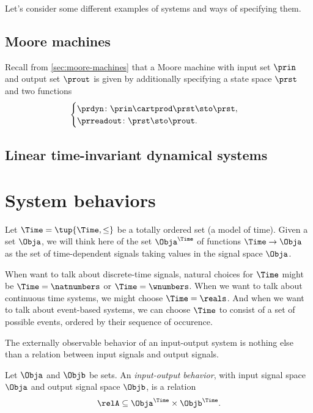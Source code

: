 

Let's consider some different examples of systems and ways of specifying them.

\subsection{Moore machines}

Recall from \cref{sec:moore-machines} that a Moore machine with input set $\prin$ and output set $\prout$ is given by additionally specifying a state space $\prst$ and two functions
\begin{equation}
    \begin{cases}
        \prdyn \colon \prin \cartprod \prst \sto \prst, \\
        \prreadout \colon \prst \sto \prout.
    \end{cases}
\end{equation}


\subsection{Linear time-invariant dynamical systems}


\section{System behaviors}

Let $\Time = \tup{\Time, \leq}$ be a totally ordered set (a model of time).
Given a set $\Obja$, we will think here of the set $\Obja^\Time$ of functions $\Time \to \Obja$ as the set of time-dependent signals taking values in the signal space $\Obja$.

When want to talk about discrete-time signals, natural choices for $\Time$ might be $\Time = \natnumbers$ or $\Time = \wnumbers$.
When we want to talk about continuous time systems, we might choose $\Time = \reals$.
And when we want to talk about event-based systems, we can choose $\Time$ to consist of a set of possible events, ordered by their sequence of occurence.

The externally observable behavior of an input-output system is nothing else than a relation between input signals and output signals.

\begin{definition}
    Let $\Obja$ and $\Objb$ be sets.
    An \emph{input-output behavior}, with input signal space $\Obja$ and output signal space $\Objb$, is a relation
    \begin{equation}
        \relA \subseteq \Obja^\Time \times \Objb^\Time.
    \end{equation}
\end{definition}

